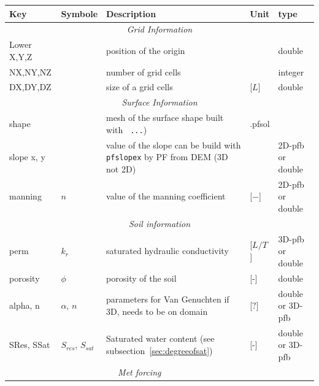 \documentclass[11pt,a4paper]{report}
\begin{document}
\begin{landscape}
\begin{table}[htbp]
\centering
\begin{tabular}{llp{10cm}ll}
\toprule
 Key     & Symbole      & Description                                                       & Unit & type             \\
\midrule
\multicolumn{5}{c}{\emph{Grid Information}}                                                                \\
Lower X,Y,Z & &position of the origin                                            &  & double           \\
NX,NY,NZ   & & number of grid cells                                              & & integer          \\
DX,DY,DZ  &  & size of a grid cells& [$L$]                                       & double           \\
\multicolumn{5}{c}{\emph{Surface Information}}                                                             \\
shape     & & mesh of the surface shape built with \verb$ ...$)                                          & .pfsol             \\
slope x, y & & value of the slope can be build with \verb$pfslopex$ by PF from DEM (3D not 2D) & & 2D-pfb or double \\
manning  &$n$ & value of the manning coefficient &[$-$]                           & 2D-pfb or double \\
\multicolumn{5}{c}{\emph{Soil information}                                                               } \\
perm     & $ k_r $  & saturated hydraulic conductivity& [$L/T$]                         & 3D-pfb or double \\
porosity   &$\phi$ & porosity of the soil                                              &[-] & double           \\
alpha, n   & $\alpha$, $n$ & parameters for Van Genuchten if 3D, needs to be on domain& [$?$]                      & double or 3D-pfb         \\
SRes, SSat  & $S_{res}$, $S_{sat}$ &                                                                  Saturated water content (see subsection~\ref{sec:degreeofsat}) & [-] & double or 3D-pfb          \\
\multicolumn{4}{c}{\emph{Met forcing}}                                                                     \\

\end{tabular}
\end{table}
\end{landscape}
\end{document}
